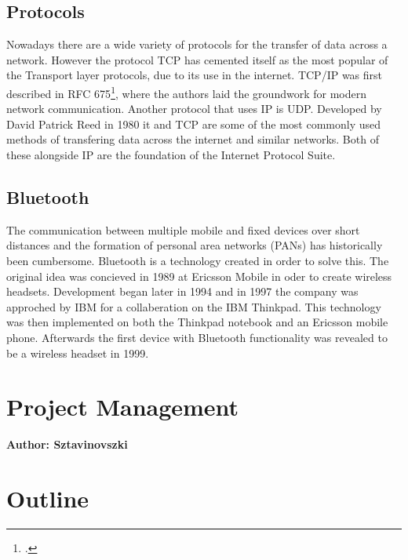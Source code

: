 \subsection{Protocols}
Nowadays there are a wide variety of protocols for the transfer of data across a network. However the protocol TCP has cemented 
itself as the most popular of the Transport layer protocols, due to its use in the internet. TCP/IP was first described in
RFC 675\footcite{rfc_675}, where the authors laid the groundwork for modern network communication. Another protocol that uses IP
is UDP. Developed by David Patrick Reed in 1980 it and TCP are some of the most commonly used methods of transfering data across
the internet and similar networks. Both of these alongside IP are the foundation of the Internet Protocol Suite.   

\subsection{Bluetooth}
The communication between multiple mobile and fixed devices over short distances and the formation of personal area networks (PANs)
has historically been cumbersome. Bluetooth is a technology created in order to solve this. The original idea was concieved in 1989
at Ericsson Mobile in oder to create wireless headsets. Development began later in 1994 and in 1997 the company was approched by IBM
for a collaberation on the IBM Thinkpad. This technology was then implemented on both the Thinkpad notebook and an Ericsson mobile phone.
Afterwards the first device with Bluetooth functionality was revealed to be a wireless headset in 1999.

\section{Project Management}
\textbf{Author: Sztavinovszki}

\section{Outline}


